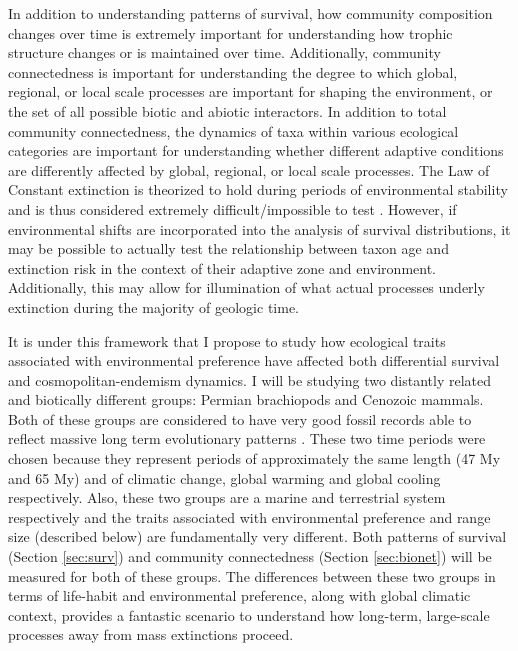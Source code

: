 \documentclass[12pt,letterpaper]{article}
\begin{document}
In addition to understanding patterns of survival, how community composition changes over time is extremely important for understanding how trophic structure changes or is maintained over time. Additionally, community connectedness is important for understanding the degree to which global, regional, or local scale processes are important for shaping the environment, or the set of all possible biotic and abiotic interactors. In addition to total community connectedness, the dynamics of taxa within various ecological categories are important for understanding whether different adaptive conditions are differently affected by global, regional, or local scale processes. The Law of Constant extinction is theorized to hold during periods of environmental stability and is thus considered extremely difficult/impossible to test \citep{Liow2011a}. However, if environmental shifts are incorporated into the analysis of survival distributions, it may be possible to actually test the relationship between taxon age and extinction risk in the context of their adaptive zone and environment. Additionally, this may allow for illumination of what actual processes underly extinction during the majority of geologic time. 

It is under this framework that I propose to study how ecological traits associated with environmental preference have affected both differential survival and cosmopolitan-endemism dynamics. I will be studying two distantly related and biotically different groups: Permian brachiopods and Cenozoic mammals. Both of these groups are considered to have very good fossil records able to reflect massive long term evolutionary patterns \citep{Mark1977}. These two time periods were chosen because they represent periods of approximately the same length (47 My and 65 My) and of climatic change, global warming and global cooling respectively. Also, these two groups are a marine and terrestrial system respectively and the traits associated with environmental preference and range size (described below) are fundamentally very different. Both patterns of survival (Section \ref{sec:surv}) and community connectedness (Section \ref{sec:bionet}) will be measured for both of these groups. The differences between these two groups in terms of life-habit and environmental preference, along with global climatic context, provides a fantastic scenario to understand how long-term, large-scale processes away from mass extinctions proceed.
\end{document}
